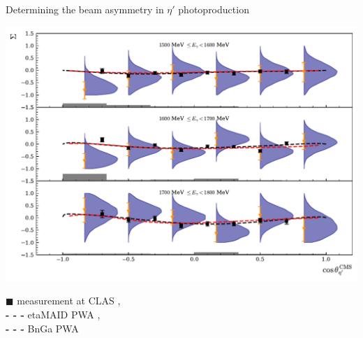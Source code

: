 \documentclass[11pt,aspectratio=169,dvipsnames]{beamer}
\begin{document}
	\begin{frame}{Determining the beam asymmetry in $\eta'$ photoproduction}
		\begin{minipage}{.8\linewidth}
			\includegraphics[width=.97\linewidth]{../../bayes/etap_event_based_fit/plots/sigma_etap_pwa_data_talk.pdf}
		\end{minipage}
		\begin{minipage}{.19\linewidth}
				{\scriptsize $\blacksquare$ measurement at CLAS \cites{collins} ,\\
				\textbf{- - -} etaMAID PWA \cites{etaMAID},\\
			 {\color{red}\textbf{- - -}} BnGa PWA\\ \cites{etap_bnga} }
		\end{minipage}
	\end{frame}

	
	
	
\end{document}
